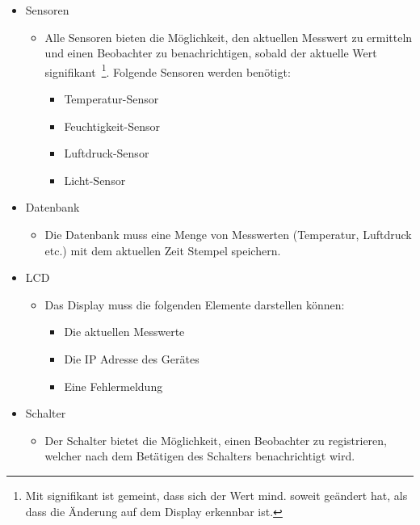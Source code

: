 \documentclass[
    10pt,
    a4paper,
]{scrartcl}
\begin{document}
\begin{itemize}
    \item Sensoren
        \begin{itemize}
            \item Alle Sensoren bieten die Möglichkeit, den aktuellen Messwert zu
                ermitteln und einen Beobachter zu benachrichtigen, sobald der aktuelle Wert
                signifikant~\footnote{Mit signifikant ist gemeint, dass sich der Wert mind. soweit
                geändert hat, als dass die Änderung auf dem Display erkennbar ist.}.
                Folgende Sensoren werden benötigt:
                \begin{itemize}
                    \item Temperatur-Sensor
                    \item Feuchtigkeit-Sensor
                    \item Luftdruck-Sensor
                    \item Licht-Sensor
                \end{itemize}
        \end{itemize}
    \item Datenbank
        \begin{itemize}
            \item Die Datenbank muss eine Menge von Messwerten (Temperatur, Luftdruck
                etc.) mit dem aktuellen Zeit Stempel speichern.
        \end{itemize}
    \item LCD
        \begin{itemize}
            \item Das Display muss die folgenden Elemente darstellen können:
                \begin{itemize}
                    \item Die aktuellen Messwerte
                    \item Die IP Adresse des Gerätes
                    \item Eine Fehlermeldung
                \end{itemize}
        \end{itemize}
    \item Schalter
        \begin{itemize}
            \item Der Schalter bietet die Möglichkeit, einen Beobachter zu registrieren,
                welcher nach dem Betätigen des Schalters benachrichtigt wird.
        \end{itemize}
\end{itemize}
\end{document}
